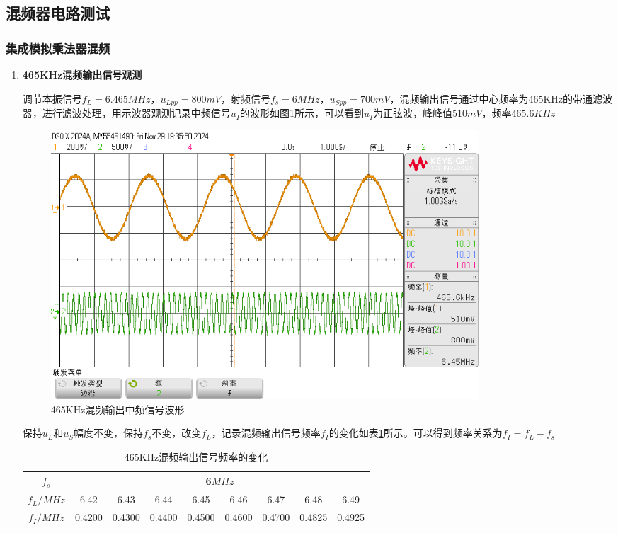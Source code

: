 \documentclass[UTF8]{ctexart}
\begin{document}
\subsection{混频器电路测试}
\subsubsection{集成模拟乘法器混频}
\begin{enumerate}
    \item \textbf{465KHz混频输出信号观测}

    调节本振信号$f_L=6.465MHz$，$u_{Lpp}=800mV$，射频信号$f_s=6MHz$，$u_{Spp}=700mV$，混频输出信号通过中心频率为465KHz的带通滤波器，进行滤波处理，用示波器观测记录中频信号$u_I$的波形如图\ref{fig:11}所示，可以看到$u_I$为正弦波，峰峰值$510mV$，频率$465.6KHz$
    \begin{figure}[H]
        \centering
        \includegraphics[width=0.8\textwidth]{pics/11.png}

        \caption{465KHz混频输出中频信号波形}\label{fig:11}
    \end{figure}
    \vspace{-2em}
    保持$u_L$和$u_S$幅度不变，保持$f_s$不变，改变$f_L$，记录混频输出信号频率$f_I$的变化如表\ref{tab:1}所示。可以得到频率关系为$f_I=f_L-f_s$
    \begin{table}[H]
        \centering
        \caption{465KHz混频输出信号频率的变化}
        \label{tab:1}
        \begin{tabular}{c|cccccccc}
        \hline
        $f_s$ &
          \multicolumn{8}{c}{6$MHz$} \\ \hline
        $f_L/MHz$ &
          \multicolumn{1}{c|}{6.42} &
          \multicolumn{1}{c|}{6.43} &
          \multicolumn{1}{c|}{6.44} &
          \multicolumn{1}{c|}{6.45} &
          \multicolumn{1}{c|}{6.46} &
          \multicolumn{1}{c|}{6.47} &
          \multicolumn{1}{c|}{6.48} &
          6.49 \\ \hline
        $f_I/MHz$ &
          \multicolumn{1}{c|}{0.4200} &
          \multicolumn{1}{c|}{0.4300} &
          \multicolumn{1}{c|}{0.4400} &
          \multicolumn{1}{c|}{0.4500} &
          \multicolumn{1}{c|}{0.4600} &
          \multicolumn{1}{c|}{0.4700} &
          \multicolumn{1}{c|}{0.4825} &
          0.4925 \\ \hline
        \end{tabular}
    \end{table}
    \vspace{-1em}


\end{enumerate}
\end{document}
